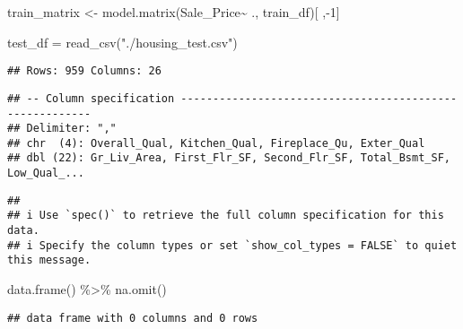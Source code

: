 \documentclass[
]{article}
\newenvironment{Shaded}{\begin{snugshade}}{\end{snugshade}}
\newcommand{\DecValTok}[1]{\textcolor[rgb]{0.00,0.00,0.81}{#1}}
\newcommand{\FunctionTok}[1]{\textcolor[rgb]{0.00,0.00,0.00}{#1}}
\newcommand{\NormalTok}[1]{#1}
\newcommand{\OtherTok}[1]{\textcolor[rgb]{0.56,0.35,0.01}{#1}}
\newcommand{\SpecialCharTok}[1]{\textcolor[rgb]{0.00,0.00,0.00}{#1}}
\newcommand{\StringTok}[1]{\textcolor[rgb]{0.31,0.60,0.02}{#1}}
\begin{document}
\begin{Shaded}
\begin{Highlighting}[]
\NormalTok{train\_matrix }\OtherTok{\textless{}{-}} \FunctionTok{model.matrix}\NormalTok{(Sale\_Price}\SpecialCharTok{\textasciitilde{}}\NormalTok{ ., train\_df)[ ,}\SpecialCharTok{{-}}\DecValTok{1}\NormalTok{] }

\NormalTok{test\_df }\OtherTok{=} \FunctionTok{read\_csv}\NormalTok{(}\StringTok{"./housing\_test.csv"}\NormalTok{)}
\end{Highlighting}
\end{Shaded}

\begin{verbatim}
## Rows: 959 Columns: 26
\end{verbatim}

\begin{verbatim}
## -- Column specification --------------------------------------------------------
## Delimiter: ","
## chr  (4): Overall_Qual, Kitchen_Qual, Fireplace_Qu, Exter_Qual
## dbl (22): Gr_Liv_Area, First_Flr_SF, Second_Flr_SF, Total_Bsmt_SF, Low_Qual_...
\end{verbatim}

\begin{verbatim}
## 
## i Use `spec()` to retrieve the full column specification for this data.
## i Specify the column types or set `show_col_types = FALSE` to quiet this message.
\end{verbatim}

\begin{Shaded}
\begin{Highlighting}[]
  \FunctionTok{data.frame}\NormalTok{() }\SpecialCharTok{\%\textgreater{}\%} 
  \FunctionTok{na.omit}\NormalTok{()}
\end{Highlighting}
\end{Shaded}

\begin{verbatim}
## data frame with 0 columns and 0 rows
\end{verbatim}
\end{document}
